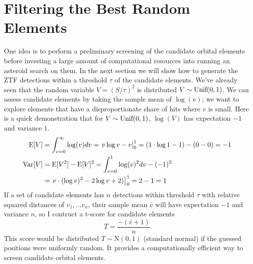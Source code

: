 \section{Filtering the Best Random Elements}
\label{section_best_random_elements}
One idea is to perform a preliminary screening of the candidate orbital elements 
before investing a large amount of computational resources into running an asteroid search on them.
In the next section we will show how to generate the ZTF detections within a threshold $\tau$ of the candidate elements.
We've already seen that the random variable $V = (S/ \tau)^2$ is distributed $V \sim \textnormal{Unif}(0, 1)$.
We can assess candidate elements by taking the sample mean of $\log(v)$;
we want to explore elements that have a disproportionate share of hits where $v$ is small.
Here is a quick demonstration that for $V \sim \textnormal{Unif}(0,1)$, $\log(V)$ has expectation $-1$ and variance $1$.
\begin{align*}
\mathrm{E}[ V ] &= \int_{v=0}^{\infty} \log (v) dv = \left. v \log v - v \right]_{0}^{1} = (1 \cdot \log 1 - 1) - (0 - 0) = -1 \\
\mathrm{Var}[V ] &= \mathrm{E}[V^2] - \mathrm{E}[V]^2 = \int_{v=0}^{1} \log(v)^2 dv - (-1)^2 \\
&= \left. v \cdot (\log v)^2 - 2 \log v + 2) \right]_{0}^{1} = 2 -1 = 1
\end{align*}
If a set of candidate elements has $n$ detections within threshold $\tau$ with relative squared distances of $v_1, \ldots v_n$,
their sample mean $\bar{v}$ will have expectation $-1$ and variance $n$, so I contruct a t-score for candidate elements
$$T = \frac{-(\bar{v} + 1)}{n}$$
This score would be distributed $T \sim \mathrm{N}(0, 1)$ (standard normal) if the guessed positions were uniformly random.
It provides a computationally efficient way to screen candidate orbital elements.

